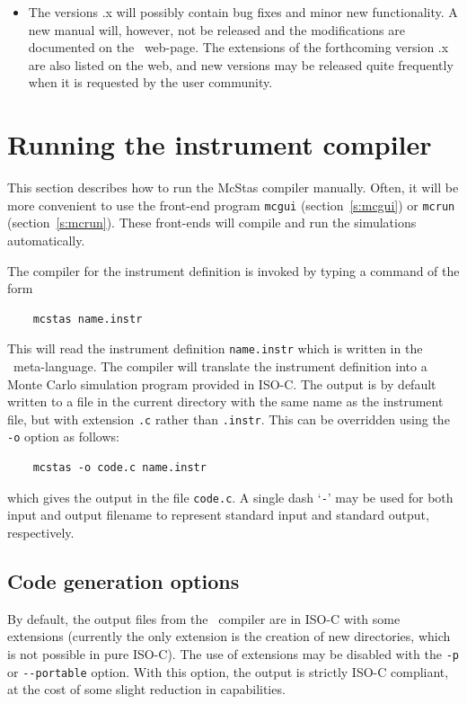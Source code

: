 \begin{itemize}
\item The versions {\version}.x will possibly contain bug fixes and minor new
  functionality. A new manual will, however, not be released and the
  modifications are documented on the \MCS\ web-page. The extensions of the
  forthcoming version {\version}.x are also listed on the web, and new versions
  may be released quite frequently when it is requested by the user community.
\end{itemize}

\section{Running the instrument compiler}
\label{s:running}

This section describes how to run the McStas compiler manually. Often,
it will be more convenient to use the front-end program \verb+mcgui+
(section~\ref{s:mcgui}) or \verb+mcrun+ (section~\ref{s:mcrun}). These
front-ends will compile and run the simulations automatically.
 

The compiler for the \MCS{} instrument definition
is invoked by typing a command of the form
\begin{verbatim}
    mcstas name.instr
\end{verbatim}
This will read the instrument definition \verb+name.instr+ which is
written in the \MCS\ meta-language. The compiler will translate the
instrument definition into a Monte Carlo simulation program provided in
ISO-C. The output is by default written to a file in the current
directory with the same name as the instrument file, but with extension
\verb+.c+ rather than \verb+.instr+. This can be overridden using the
\verb+-o+ option as follows:
\begin{verbatim}
    mcstas -o code.c name.instr
\end{verbatim}
which gives the output in the file \verb+code.c+.
A single dash `\verb+-+' may be used for both input and output filename
to represent standard input and standard output, respectively.


\subsection{Code generation options}

By default, the output files from the \MCS\ compiler are in ISO-C with
some extensions (currently the only extension is the creation of new
directories, which is not possible in pure ISO-C). The use of
extensions may be disabled with the \verb+-p+ or \verb+--portable+
option. With this option, the output is strictly ISO-C compliant, at
the cost of some slight reduction in capabilities.

